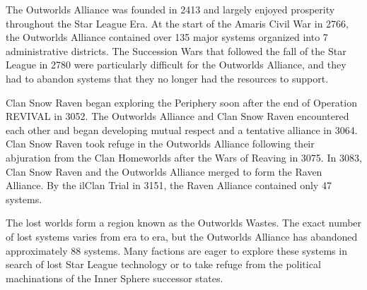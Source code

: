 The Outworlds Alliance was founded in 2413 and largely enjoyed prosperity throughout the Star League Era.
At the start of the Amaris Civil War in 2766, the Outworlds Alliance contained over 135 major systems organized into 7 administrative districts.
The Succession Wars that followed the fall of the Star League in 2780 were particularly difficult for the Outworlds Alliance, and they had to abandon systems that they no longer had the resources to support.

Clan Snow Raven began exploring the Periphery soon after the end of Operation REVIVAL in 3052.
The Outworlds Alliance  and Clan Snow Raven encountered each other and began developing mutual respect and a tentative alliance in 3064.
Clan Snow Raven took refuge in the Outworlds Alliance following their abjuration from the Clan Homeworlds after the Wars of Reaving in 3075.
In 3083, Clan Snow Raven and the Outworlds Alliance merged to form the Raven Alliance.
By the ilClan Trial in 3151, the Raven Alliance contained only 47 systems.

The lost worlds form a region known as the Outworlds Wastes.
The exact number of lost systems varies from era to era, but the Outworlds Alliance has abandoned approximately 88 systems.
Many factions are eager to explore these systems in search of lost Star League technology or to take refuge from the political machinations of the Inner Sphere successor states.
